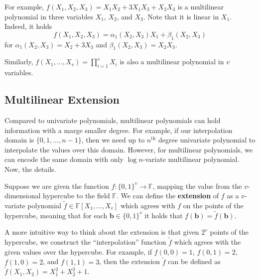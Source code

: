 \begin{example}
    For example, $f(X_1,X_2,X_3)=X_1X_2 + 3X_1X_3 + X_2X_3$ is a multilinear 
    polynomial in three variables $X_1$, $X_2$, and $X_3$. Note that it is linear 
    in $X_1$. Indeed, it holds
    \begin{equation*}
        f(X_1,X_2,X_3) = \alpha_1(X_2,X_3)X_1 + \beta_1(X_2,X_3)
    \end{equation*}
    for $\alpha_1(X_2,X_3) = X_2 + 3X_3$ and $\beta_1(X_2,X_3) = X_2X_3$.

    Similarly, $f(X_1,\dots,X_v)=\prod_{i=1}^v X_i$ is also a multilinear
    polynomial in $v$ variables.
\end{example}

\subsection{Multilinear Extension}

Compared to univariate polynomials, multilinear polynomials can hold information
with a marge smaller degree. For example, if our interpolation domain is
$\{0,1,\dots,n-1\}$, then we need up to $n^{\text{th}}$ degree univariate
polynomial to interpolate the values over this domain. However, for multilinear
polynomials, we can encode the same domain with only $\log n$-variate
multilinear polynomial. Now, the details. 

\begin{definition}
    Suppose we are given the function $f: \{0,1\}^v \to \mathbb{F}$, mapping the
value from the $v$-dimensional hypercube to the field $\mathbb{F}$. We can
define the \textbf{extension} of $f$ as a $v$-variate polynomial $\widetilde{f}
\in \mathbb{F}[X_1,\dots,X_v]$ which agrees with $f$ on the points of the
hypercube, meaning that for each $\boldsymbol{b} \in \{0,1\}^v$ it holds that
$f(\boldsymbol{b}) = \widetilde{f}(\boldsymbol{b})$.
\end{definition}

\begin{example}
    A more intuitive way to think about the extension is that given $2^v$ points
    of the hypercube, we construct the ``interpolation'' function
    $\widetilde{f}$ which agrees with the given values over the hypercube. For
    example, if $f(0,0) = 1$, $f(0,1) = 2$, $f(1,0) = 2$, and $f(1,1) = 3$, then
    the extension $\widetilde{f}$ can be defined as
    $\widetilde{f}(X_1,X_2)=X_1^2+X_2^2+1$.
\end{example}

